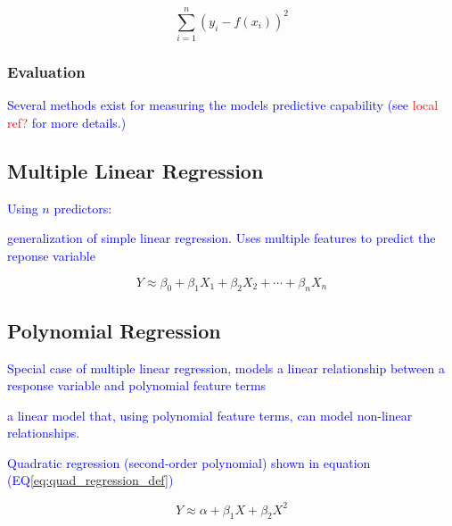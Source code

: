 \begin{equation}
{\sum_{i=1}^{n}{(y_i - f(x_i))^2}}
\label{eq:rss_def}
\end{equation}


\subsubsection{Evaluation}

\textcolor{blue}{Several methods exist for measuring the models predictive capability (see \textcolor{red}{local ref?} for more details.)}


\subsection{Multiple Linear Regression}

\textcolor{blue}{Using $n$ predictors:}

\textcolor{blue}{generalization of simple linear regression. Uses multiple features to predict the reponse variable}



\begin{equation}
{Y \approx \beta_0 + \beta_1 X_1 + \beta_2 X_2 + \cdots + \beta_n X_n}
\label{eq:mlr_ex}
\end{equation}


\subsection{Polynomial Regression}

\textcolor{blue}{Special case of multiple linear regression, models a linear relationship between a response variable and polynomial feature terms}

\textcolor{blue}{a linear model that, using polynomial feature terms, can model non-linear relationships.}

\textcolor{blue}{Quadratic regression (second-order polynomial) shown in equation (EQ\ref{eq:quad_regression_def})}

\begin{equation}
{Y \approx \alpha + \beta_1 X + \beta_2 X^2}
\label{eq:quad_regression_def}
\end{equation}








